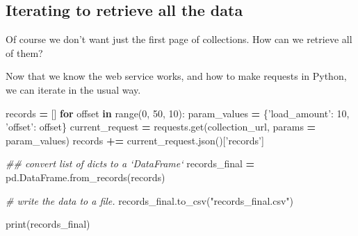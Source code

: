 \documentclass[]{book}
\newenvironment{Shaded}{\begin{snugshade}}{\end{snugshade}}
\newcommand{\KeywordTok}[1]{\textcolor[rgb]{0.13,0.29,0.53}{\textbf{#1}}}
\newcommand{\DecValTok}[1]{\textcolor[rgb]{0.00,0.00,0.81}{#1}}
\newcommand{\StringTok}[1]{\textcolor[rgb]{0.31,0.60,0.02}{#1}}
\newcommand{\CommentTok}[1]{\textcolor[rgb]{0.56,0.35,0.01}{\textit{#1}}}
\newcommand{\ControlFlowTok}[1]{\textcolor[rgb]{0.13,0.29,0.53}{\textbf{#1}}}
\newcommand{\OperatorTok}[1]{\textcolor[rgb]{0.81,0.36,0.00}{\textbf{#1}}}
\newcommand{\BuiltInTok}[1]{#1}
\newcommand{\NormalTok}[1]{#1}
\begin{document}
\subsection{Iterating to retrieve all the
data}\label{iterating-to-retrieve-all-the-data}

Of course we don't want just the first page of collections. How can we
retrieve all of them?

Now that we know the web service works, and how to make requests in
Python, we can iterate in the usual way.

\begin{Shaded}
\begin{Highlighting}[]
\NormalTok{records }\OperatorTok{=}\NormalTok{ []}
\ControlFlowTok{for}\NormalTok{ offset }\KeywordTok{in} \BuiltInTok{range}\NormalTok{(}\DecValTok{0}\NormalTok{, }\DecValTok{50}\NormalTok{, }\DecValTok{10}\NormalTok{):}
\NormalTok{    param_values }\OperatorTok{=}\NormalTok{ \{}\StringTok{'load_amount'}\NormalTok{: }\DecValTok{10}\NormalTok{, }\StringTok{'offset'}\NormalTok{: offset\}}
\NormalTok{    current_request }\OperatorTok{=}\NormalTok{ requests.get(collection_url, params }\OperatorTok{=}\NormalTok{ param_values)}
\NormalTok{    records }\OperatorTok{+=}\NormalTok{ current_request.json()[}\StringTok{'records'}\NormalTok{]}
\end{Highlighting}
\end{Shaded}

\begin{Shaded}
\begin{Highlighting}[]
\CommentTok{## convert list of dicts to a `DataFrame`}
\NormalTok{records_final }\OperatorTok{=}\NormalTok{ pd.DataFrame.from_records(records)}
\end{Highlighting}
\end{Shaded}

\begin{Shaded}
\begin{Highlighting}[]
\CommentTok{# write the data to a file.}
\NormalTok{records_final.to_csv(}\StringTok{"records_final.csv"}\NormalTok{)}
\end{Highlighting}
\end{Shaded}

\begin{Shaded}
\begin{Highlighting}[]
\BuiltInTok{print}\NormalTok{(records_final)}
\end{Highlighting}
\end{Shaded}
\end{document}
